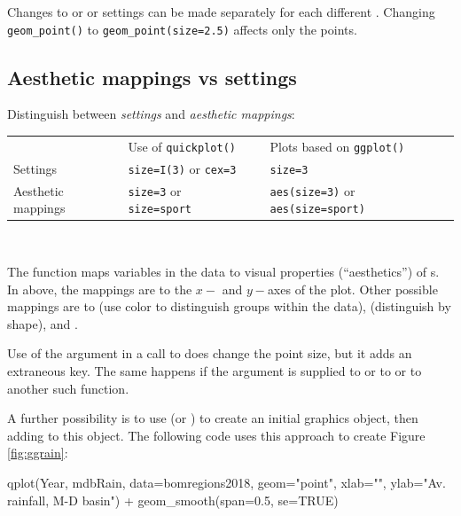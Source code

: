 Changes to  or  or  settings
can be made separately for each different .
Changing \verb!geom_point()!  to \verb!geom_point(size=2.5)! affects
only the points.

\subsection*{Aesthetic mappings vs settings}\label{ss:I(size)}

Distinguish between {\em settings} and {\em aesthetic mappings}:\\[4pt]
\hspace*{6pt}
\begin{fullwidth}
\begin{tabular}{llll}
&  Use of \texttt{quickplot()} && Plots based on \texttt{ggplot()}\\
\cline{2-2} \cline{4-4}
Settings &  \texttt{size=I(3)} or \texttt{cex=3}&&
\texttt{size=3}\\
Aesthetic mappings & \texttt{size=3} or \texttt{size=sport} &&
\texttt{aes(size=3)} or \texttt{aes(size=sport)}\\
\cline{2-2} \cline{4-4}
\end{tabular}\\[8pt]
\end{fullwidth}
The function  maps variables in the data to visual
properties (``aesthetics'') of s.  In  above, the mappings are to the $x-$ and $y-$axes of the plot.
Other possible mappings are to  (use color to distinguish
groups within the data),   (distinguish by
shape),  and .

Use of the argument  in a call to 
does change the point size, but it adds an extraneous key.
The same happens if the argument 
is supplied to  or to  or
to another such function.

A further possibility is to use  (or )
to create an initial graphics object, then adding to this object. The
following code uses this approach to create Figure \ref{fig:ggrain}:
\begin{Schunk}
\begin{Sinput}
qplot(Year, mdbRain, data=bomregions2018,
      geom="point",
      xlab="", ylab="Av. rainfall, M-D basin") +
  geom_smooth(span=0.5, se=TRUE)
\end{Sinput}
\end{Schunk}

